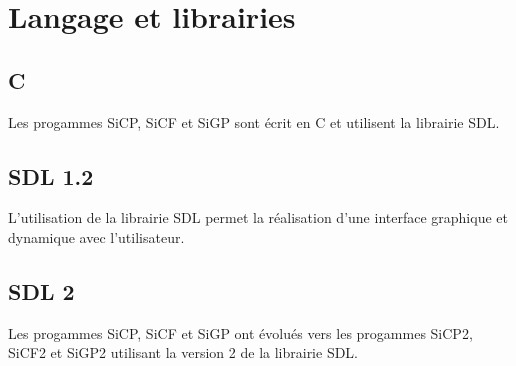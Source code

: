 %
\section{Langage et librairies}
%
%
\subsection{C}
%
Les progammes SiCP, SiCF et SiGP sont écrit en C \cite{guide-C} \cite{langage-C} et utilisent la librairie SDL.
%
\subsection{SDL 1.2}
%
L'utilisation de la librairie SDL permet la réalisation d'une interface graphique et dynamique avec l'utilisateur.
%
\subsection{SDL 2}
%
Les progammes SiCP, SiCF et SiGP ont évolués vers les progammes SiCP2, SiCF2 et SiGP2 utilisant la version 2
de la librairie SDL.
%
%
